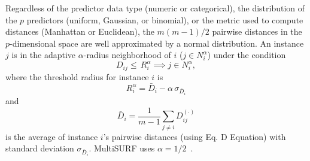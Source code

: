 \documentclass[10pt,letterpaper]{article}\usepackage[]{graphicx}\usepackage[]{color}
\begin{document}
Regardless of the predictor data type (numeric or categorical), the distribution of the $p$ predictors (uniform, Gaussian, or binomial), or the metric used to compute distances (Manhattan or Euclidean), the $m(m-1)/2$ pairwise distances in the $p$-dimensional space are well approximated by a normal distribution. An instance $j$ is in the adaptive $\alpha$-radius neighborhood of $i$ ($j \in N^{\alpha}_{i}$) under the condition
%
%
\begin{equation}
D_{ij} \le \, R_i^{\alpha} \implies j \in N^{\alpha}_{i},
\end{equation}
where the threshold radius for instance $i$ is
\begin{equation}
R_i^{\alpha} =  \bar{D}_i - \alpha \, \sigma_{\bar{D}_i}
\end{equation}
and
\begin{equation}
\bar{D}_i = \frac{1}{m-1} \sum_{j \ne i} D^{(\cdot)}_{ij}
\end{equation}
is the average of instance $i$'s pairwise distances (using Eq. D Equation) with standard deviation $\sigma_{\bar{D}_i}$. MultiSURF uses $\alpha=1/2$~\cite{msurf13}.
\end{document}
